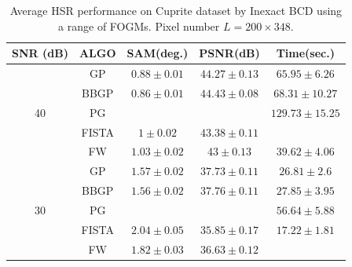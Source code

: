 \begin{table}[h]
{\begin{tabular}{|c|c|c|c|c|}
SNR (dB)            & ALGO   & SAM(deg.)                          & PSNR(dB)                            & Time(sec.)                            \tabularnewline \hline
\multirow{5}{*}{40} & GP     &                   {$0.88\pm 0.01$} &                   {$44.27\pm 0.13$} &                   {$65.95\pm 6.26$}   \tabularnewline
                    & BBGP   &                   {$0.86\pm 0.01$} &                   {$44.43\pm 0.08$} &                   {$68.31\pm 10.27$}  \tabularnewline
                    & PG     & \cellcolor{red!10}{$0.84\pm 0$}    & \cellcolor{red!10}{$44.77\pm 0.04$} &                   {$129.73\pm 15.25$} \tabularnewline
                    & FISTA  &                   {$1\pm 0.02$}    &                   {$43.38\pm 0.11$} & \cellcolor{red!10}{$26.3\pm 2.98$}    \tabularnewline
                    & FW     &                   {$1.03\pm 0.02$} &                   {$43\pm 0.13$}    &                   {$39.62\pm 4.06$}   \tabularnewline \hline \hline
\multirow{5}{*}{30} & GP     &                   {$1.57\pm 0.02$} &                   {$37.73\pm 0.11$} &                   {$26.81\pm 2.6$}    \tabularnewline
                    & BBGP   &                   {$1.56\pm 0.02$} &                   {$37.76\pm 0.11$} &                   {$27.85\pm 3.95$}   \tabularnewline
                    & PG     & \cellcolor{red!10}{$1.51\pm 0.01$} & \cellcolor{red!10}{$38.03\pm 0.07$} &                   {$56.64\pm 5.88$}   \tabularnewline
                    & FISTA  &                   {$2.04\pm 0.05$} &                   {$35.85\pm 0.17$} &                   {$17.22\pm 1.81$}   \tabularnewline
                    & FW     &                   {$1.82\pm 0.03$} &                   {$36.63\pm 0.12$} & \cellcolor{red!10}{$14.2\pm 1.4$}     \tabularnewline \hline
\end{tabular}
}
\caption{Average HSR performance on Cuprite dataset by Inexact BCD using a
         range of FOGMs. Pixel number $L = 200 \times 348$.}
\label{table:ALGO_GP_BB_PG_FISTA_FW_vs_REAL_CUPRITE_MO9_MO16}
\end{table}

